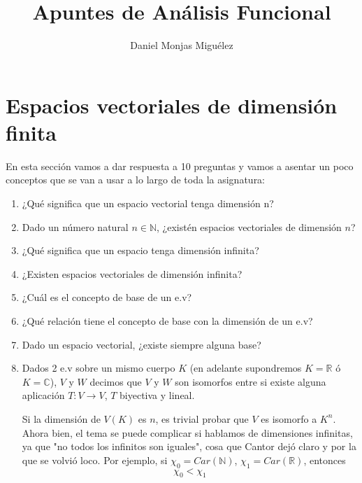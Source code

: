 \documentclass{article}
\author{Daniel Monjas Miguélez}
\title{Apuntes de Análisis Funcional}
\begin{document}
\maketitle

\newpage 

\tableofcontents

\newpage

\section{Espacios vectoriales de dimensión finita}
En esta sección vamos a dar respuesta a 10 preguntas y vamos a asentar un poco conceptos que se van a usar a lo largo de toda la asignatura:

\begin{enumerate}
\item ¿Qué significa que un espacio vectorial tenga dimensión n?

\item Dado un número natural $n\in \mathbb{N}$, ¿existén espacios vectoriales de dimensión $n$?

\item ¿Qué significa que un espacio tenga dimensión infinita?

\item ¿Existen espacios vectoriales de dimensión infinita?

\item ¿Cuál es el concepto de base de un e.v?

\item ¿Qué relación tiene el concepto de base con la dimensión de un e.v?

\item Dado un espacio vectorial, ¿existe siempre alguna base?

\item Dados 2 e.v sobre un mismo cuerpo $K$ (en adelante supondremos $K=\mathbb{R}$ ó $K=\mathbb{C}$), $V$ y $W$ decimos que $V$ y $W$ son isomorfos entre si existe alguna aplicación $T:V\rightarrow V$, $T$ biyectiva y lineal.

Si la dimensión de $V(K)$ es $n$, es trivial probar que $V$ es isomorfo a $K^n$. Ahora bien, el tema se puede complicar si hablamos de dimensiones infinitas, ya que "no todos los infinitos son iguales", cosa que Cantor dejó claro y por la que se volvió loco. Por ejemplo, si $\chi_0=Car(\mathbb{N})$, $\chi_1=Car(\mathbb{R})$, entonces
\begin{equation*}
\chi_0<\chi_1
\end{equation*}


\end{enumerate}
\end{document}
